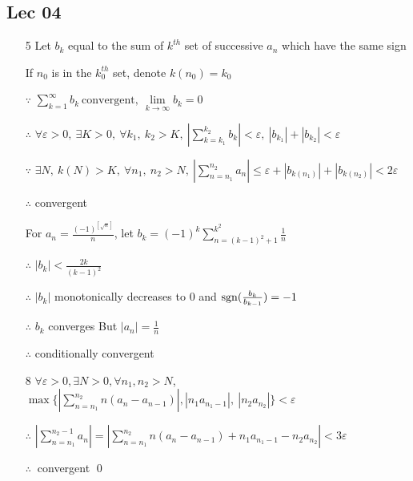 \subsection{Lec 04}
 \begin{enumerate}[1]
   \item[5]
   Let $b_k$ equal to the sum of $k^{th}$ set of successive $a_n$ which have the same sign
   \par If $n_0$ is in the $k_0^{th}$ set, denote $k(n_0)=k_0$
   \par $\because$ $ \sum\limits_{k=1}^{\infty}b_k \ \text{convergent},\ \lim\limits_{k\rightarrow\infty}b_k=0$ 
   \par $\therefore$ $\forall \varepsilon >0,\  \exists K>0,\  \forall k_1,\ k_2>K,\  |\sum\limits_{k=k_1}^{k_2}b_k|<\varepsilon,\  |b_{k_1}|+|b_{k_2}|<\varepsilon$
   \par $\because $ $\exists N,\  k(N)>K,\ \forall n_1,\ n_2>N,\ |\sum\limits_{n=n_1}^{n_2}a_n|\leqslant\varepsilon+|b_{k(n_1)}|+|b_{k(n_2)}|<2\varepsilon$
   \par $\therefore$ convergent
   \par For $a_n=\frac{(-1)^{[\sqrt{n}]}}{n}$, let $b_k=(-1)^k\sum\limits_{n=(k-1)^2+1}^{k^2}\frac{1}{n}$
   \par $\therefore$ $|b_k|<\frac{2k}{(k-1)^2}$
   \par $\therefore$ $|b_k|$ monotonically decreases to $0$ and $\mathop{\mathrm{sgn}} (\frac{b_k}{b_{k-1}})=-1$
   \par $\therefore$ $b_k$ converges
   But $|a_n|=\frac{1}{n}$
   \par $\therefore$ conditionally convergent

   \item[8]
   $\forall \varepsilon >0, \exists N>0, \forall n_1,n_2>N$, $\max \{|\sum\limits_{n=n_1}^{n_2}n(a_n-a_{n-1})|, |n_1a_{n_1-1}| ,\ |n_2a_{n_2}|\}<\varepsilon$
   \par $\therefore$ $|\sum\limits_{n=n_1}^{n_2-1}a_n|=|\sum\limits_{n=n_1}^{n_2}n(a_n-a_{n-1})+n_1a_{n_1-1}-n_2a_{n_2}|<3\varepsilon$
   \par $ \therefore \ $ convergent \qed
   \end{enumerate}

